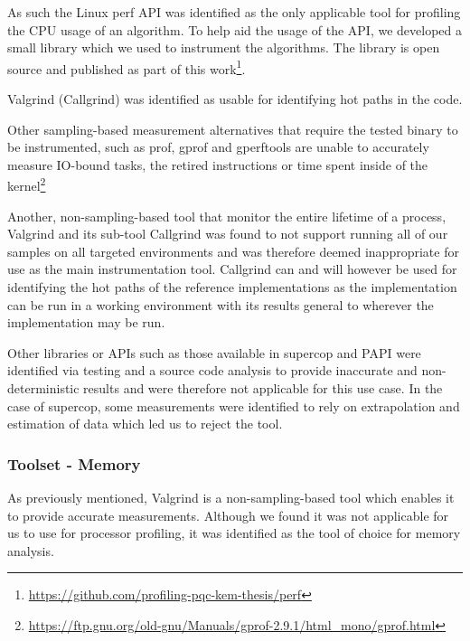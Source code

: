 As such the Linux perf API was identified as the only applicable tool for profiling the CPU usage of an algorithm. To help aid the usage of the API, we developed a small library which we used to instrument the algorithms. The library is open source and published as part of this work\footnote{\href{https://github.com/profiling-pqc-kem-thesis/perf}{https://github.com/profiling-pqc-kem-thesis/perf}}.

Valgrind (Callgrind) was identified as usable for identifying hot paths in the code.

\noindent
{}
Other sampling-based measurement alternatives that require the tested binary to be instrumented, such as prof, gprof and gperftools are unable to accurately measure IO-bound tasks, the retired instructions or time spent inside of the kernel\footnote{\href{https://ftp.gnu.org/old-gnu/Manuals/gprof-2.9.1/html\_mono/gprof.html}{https://ftp.gnu.org/old-gnu/Manuals/gprof-2.9.1/html\_mono/gprof.html}}

Another, non-sampling-based tool that monitor the entire lifetime of a process, Valgrind and its sub-tool Callgrind was found to not support running all of our samples on all targeted environments and was therefore deemed inappropriate for use as the main instrumentation tool. Callgrind can and will however be used for identifying the hot paths of the reference implementations as the implementation can be run in a working environment with its results general to wherever the implementation may be run.

Other libraries or APIs such as those available in \gls{supercop} and PAPI were identified via testing and a source code analysis to provide inaccurate and non-deterministic results and were therefore not applicable for this use case. In the case of \gls{supercop}, some measurements were identified to rely on extrapolation and estimation of data which led us to reject the tool.

\subsubsection{Toolset - Memory}
As previously mentioned, Valgrind is a non-sampling-based tool which enables it to provide accurate measurements. Although we found it was not applicable for us to use for processor profiling, it was identified as the tool of choice for memory analysis.

